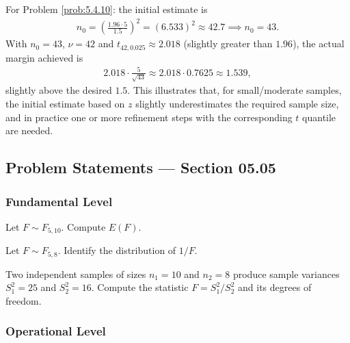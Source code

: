 \begin{solucion}
	\label{sol:5.4.10}
	For Problem \ref{prob:5.4.10}: the initial estimate is
	\begin{align*}
		n_0 = \left(\frac{1.96\cdot 5}{1.5}\right)^2 = (6.533)^2 \approx 42.7 \implies n_0 = 43.
	\end{align*}
	With $n_0=43$, $\nu=42$ and $t_{42,0.025}\approx 2.018$ (slightly greater than $1.96$), the actual margin achieved is
	\begin{align*}
		2.018\cdot\frac{5}{\sqrt{43}} \approx 2.018\cdot 0.7625 \approx 1.539,
	\end{align*}
	slightly above the desired $1.5$. This illustrates that, for small/moderate samples, the initial estimate based on $z$ slightly underestimates the required sample size, and in practice one or more refinement steps with the corresponding $t$ quantile are needed. \quad \qedhere
\end{solucion}


\subsection*{Problem Statements --- Section 05.05}

\subsubsection*{Fundamental Level}

\begin{problema}
	\label{prob:5.5.1}
	Let $F \sim F_{5,10}$. Compute $E(F)$.
\end{problema}

\begin{problema}
	\label{prob:5.5.2}
	Let $F \sim F_{5,8}$. Identify the distribution of $1/F$.
\end{problema}

\begin{problema}
	\label{prob:5.5.3}
	Two independent samples of sizes $n_1=10$ and $n_2=8$ produce sample variances $S_1^2=25$ and $S_2^2=16$. Compute the statistic $F=S_1^2/S_2^2$ and its degrees of freedom.
\end{problema}

\subsubsection*{Operational Level}

